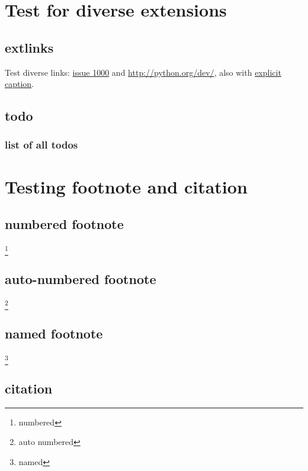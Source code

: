 \documentclass[letterpaper,10pt,english]{sphinxhowto}
\begin{document}
\section{Test for diverse extensions}
\label{extensions::doc}\label{extensions:test-for-diverse-extensions}

\subsection{extlinks}
\label{extensions:extlinks}
Test diverse links: \href{http://bugs.python.org/issue1000}{issue 1000} and \url{http://python.org/dev/}, also with
\href{http://bugs.python.org/issue1042}{explicit caption}.


\subsection{todo}
\label{extensions:todo}

\subsubsection{list of all todos}
\label{extensions:list-of-all-todos}

\section{Testing footnote and citation}
\label{footnote:testing-footnote-and-citation}\label{footnote::doc}

\subsection{numbered footnote}
\label{footnote:numbered-footnote}
\footnote[1]{\sphinxAtStartFootnote%
numbered
}


\subsection{auto-numbered footnote}
\label{footnote:auto-numbered-footnote}
\footnote[2]{\sphinxAtStartFootnote%
auto numbered
}


\subsection{named footnote}
\label{footnote:named-footnote}
\footnote[3]{\sphinxAtStartFootnote%
named
}


\subsection{citation}
\label{footnote:citation}
\label{footnote:id4}{\hyperref[footnote:bar]{\crossref{{[}bar{]}}}}
\end{document}

